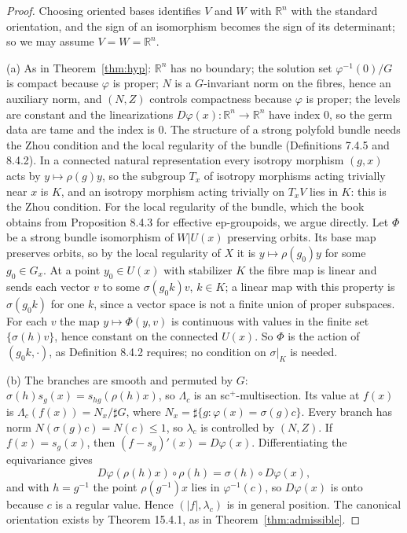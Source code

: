 \documentclass[11pt,a4paper]{article}
\theoremstyle{plain}
\theoremstyle{definition}
\theoremstyle{remark}
\newcommand{\R}{\mathbb{R}}
\newcommand{\abs}[1]{\lvert #1\rvert}
\newcommand{\card}{\sharp}
\begin{document}
\begin{proof}
Choosing oriented bases identifies $V$ and $W$ with $\R^n$ with the standard orientation, and the sign
of an isomorphism becomes the sign of its determinant; so we may assume $V=W=\R^n$.

(a) As in Theorem~\ref{thm:hyp}: $\R^n$ has no boundary; the solution set $\varphi^{-1}(0)/G$ is compact
because $\varphi$ is proper; $N$ is a $G$-invariant norm on the fibres, hence an auxiliary norm, and
$(N,Z)$ controls compactness because $\varphi$ is proper; the levels are constant and the linearizations
$D\varphi(x)\colon\R^n\to\R^n$ have index $0$, so the germ data are tame and the index is $0$.
The structure of a strong polyfold bundle needs the Zhou condition and the local regularity of the
bundle (Definitions 7.4.5 and 8.4.2). In a connected natural representation every isotropy morphism
$(g,x)$ acts by $y\mapsto\rho(g)y$, so the subgroup $T_x$ of isotropy morphisms acting trivially near $x$
is $K$, and an isotropy morphism acting trivially on $T_xV$ lies in $K$: this is the Zhou condition.
For the local regularity of the bundle, which the book obtains from Proposition 8.4.3 for effective
ep-groupoids, we argue directly. Let $\Phi$ be a strong bundle isomorphism of $W|U(x)$ preserving
orbits. Its base map preserves orbits, so by the local regularity of $X$ it is $y\mapsto\rho(g_0)y$ for
some $g_0\in G_x$. At a point $y_0\in U(x)$ with stabilizer $K$ the fibre map is linear and sends each
vector $v$ to some $\sigma(g_0k)v$, $k\in K$; a linear map with this property is $\sigma(g_0k)$ for one
$k$, since a vector space is not a finite union of proper subspaces. For each $v$ the map
$y\mapsto\Phi(y,v)$ is continuous with values in the finite set $\{\sigma(h)v\}$, hence constant on the
connected $U(x)$. So $\Phi$ is the action of $(g_0k,\cdot)$, as Definition 8.4.2 requires; no condition on
$\sigma|_K$ is needed.

(b) The branches are smooth and permuted by $G$: $\sigma(h)s_g(x)=s_{hg}(\rho(h)x)$, so $\Lambda_c$ is an
sc$^+$-multisection. Its value at $f(x)$ is $\Lambda_c(f(x))=N_x/\card G$, where
$N_x=\card\{g:\varphi(x)=\sigma(g)c\}$. Every branch has norm $N(\sigma(g)c)=N(c)\le1$, so $\lambda_c$ is
controlled by $(N,Z)$. If $f(x)=s_g(x)$, then $(f-s_g)'(x)=D\varphi(x)$. Differentiating the equivariance
gives
\begin{equation}\label{eq:equivD}
  D\varphi(\rho(h)x)\circ\rho(h)=\sigma(h)\circ D\varphi(x),
\end{equation}
and with $h=g^{-1}$ the point $\rho(g^{-1})x$ lies in $\varphi^{-1}(c)$, so $D\varphi(x)$ is onto because
$c$ is a regular value. Hence $(\abs f,\lambda_c)$ is in general position. The canonical orientation
exists by Theorem 15.4.1, as in Theorem~\ref{thm:admissible}.


\end{proof}
\end{document}
